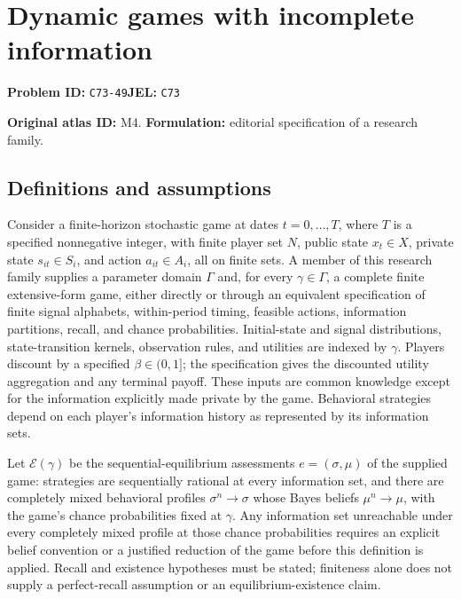 \documentclass[11pt,a4paper]{article}
\begin{document}
\section*{Dynamic games with incomplete information}
\textbf{Problem ID:} \texttt{C73-49}\quad \textbf{JEL:} \texttt{C73}\par
\label{problem:OP-0004}
\label{atlas:prob:M4}

\noindent\textbf{Original atlas ID:} M4. \textbf{Formulation:} editorial specification of a research family.

\subsection*{Definitions and assumptions}

Consider a finite-horizon stochastic game at dates $t=0,\ldots,T$, where $T$ is a specified nonnegative integer, with finite player set $N$, public state $x_t\in X$, private state $s_{it}\in S_i$, and action $a_{it}\in A_i$, all on finite sets. A member of this research family supplies a parameter domain $\Gamma$ and, for every $\gamma\in\Gamma$, a complete finite extensive-form game, either directly or through an equivalent specification of finite signal alphabets, within-period timing, feasible actions, information partitions, recall, and chance probabilities. Initial-state and signal distributions, state-transition kernels, observation rules, and utilities are indexed by $\gamma$. Players discount by a specified $\beta\in(0,1]$; the specification gives the discounted utility aggregation and any terminal payoff. These inputs are common knowledge except for the information explicitly made private by the game. Behavioral strategies depend on each player's information history as represented by its information sets.

Let $\mathcal E(\gamma)$ be the sequential-equilibrium assessments $e=(\sigma,\mu)$ of the supplied game: strategies are sequentially rational at every information set, and there are completely mixed behavioral profiles $\sigma^n\to\sigma$ whose Bayes beliefs $\mu^n\to\mu$, with the game's chance probabilities fixed at $\gamma$. Any information set unreachable under every completely mixed profile at those chance probabilities requires an explicit belief convention or a justified reduction of the game before this definition is applied. Recall and existence hypotheses must be stated; finiteness alone does not supply a perfect-recall assumption or an equilibrium-existence claim.
\end{document}
